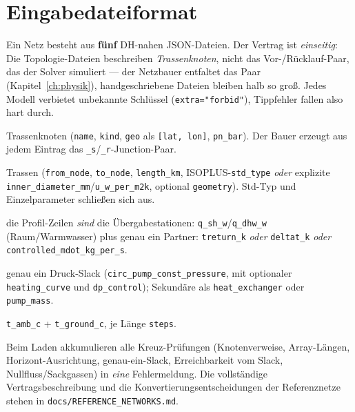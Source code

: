 \documentclass[11pt,a4paper,parskip=half]{scrreprt}
\newcommand{\api}[1]{\texttt{#1}}
\begin{document}
\chapter{Eingabedateiformat}
\label{app:eingabe}

Ein Netz besteht aus \textbf{fünf} DH-nahen JSON-Dateien. Der Vertrag ist
\emph{einseitig}: Die Topologie-Dateien beschreiben \emph{Trassenknoten}, nicht
das Vor-/Rücklauf-Paar, das der Solver simuliert --- der Netzbauer entfaltet das
Paar (Kapitel~\ref{ch:physik}), handgeschriebene Dateien bleiben halb so groß.
Jedes Modell verbietet unbekannte Schlüssel (\texttt{extra="forbid"}), Tippfehler
fallen also hart durch.

\begin{description}[nosep]
  \item[\texttt{network\_structure.json}] Trassenknoten (\texttt{name},
    \texttt{kind}, \texttt{geo} als \texttt{[lat, lon]}, \texttt{pn\_bar}). Der
    Bauer erzeugt aus jedem Eintrag das \texttt{\_s}/\texttt{\_r}-Junction-Paar.
  \item[\texttt{pipes.json}] Trassen (\texttt{from\_node}, \texttt{to\_node},
    \texttt{length\_km}, ISOPLUS-\texttt{std\_type} \emph{oder} explizite
    \texttt{inner\_diameter\_mm}/\texttt{u\_w\_per\_m2k}, optional
    \texttt{geometry}). Std-Typ und Einzelparameter schließen sich aus.
  \item[\texttt{consumers.json}] die Profil-Zeilen \emph{sind} die
    Übergabestationen: \texttt{q\_sh\_w}/\texttt{q\_dhw\_w} (Raum/Warmwasser)
    plus genau ein Partner: \texttt{treturn\_k} \emph{oder} \texttt{deltat\_k}
    \emph{oder} \texttt{controlled\_mdot\_kg\_per\_s}.
  \item[\texttt{producers.json}] genau ein Druck-Slack
    (\texttt{circ\_pump\_const\_pressure}, mit optionaler \texttt{heating\_curve}
    und \texttt{dp\_control}); Sekundäre als \texttt{heat\_exchanger} oder
    \texttt{pump\_mass}.
  \item[\texttt{weather.json}] \texttt{t\_amb\_c} + \texttt{t\_ground\_c}, je
    Länge \texttt{steps}.
\end{description}

Beim Laden akkumulieren alle Kreuz-Prüfungen (Knotenverweise, Array-Längen,
Horizont-Ausrichtung, genau-ein-Slack, Erreichbarkeit vom Slack,
Nullfluss/Sackgassen) in \emph{eine} Fehlermeldung. Die vollständige
Vertragsbeschreibung und die Konvertierungsentscheidungen der Referenznetze
stehen in \api{docs/REFERENCE\_NETWORKS.md}.
\end{document}
